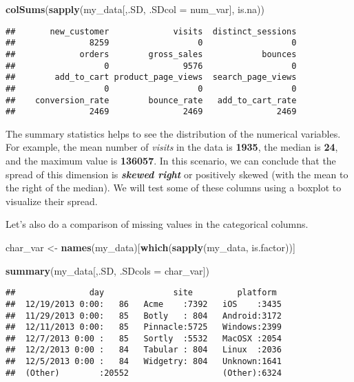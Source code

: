 \documentclass[]{article}
\newenvironment{Shaded}{\begin{snugshade}}{\end{snugshade}}
\newcommand{\KeywordTok}[1]{\textcolor[rgb]{0.13,0.29,0.53}{\textbf{{#1}}}}
\newcommand{\DataTypeTok}[1]{\textcolor[rgb]{0.13,0.29,0.53}{{#1}}}
\newcommand{\StringTok}[1]{\textcolor[rgb]{0.31,0.60,0.02}{{#1}}}
\newcommand{\NormalTok}[1]{{#1}}
\begin{document}
\begin{Shaded}
\begin{Highlighting}[]
\KeywordTok{colSums}\NormalTok{(}\KeywordTok{sapply}\NormalTok{(my_data[,.SD, }\DataTypeTok{.SDcol =} \NormalTok{num_var], is.na))}
\end{Highlighting}
\end{Shaded}

\begin{verbatim}
##       new_customer             visits  distinct_sessions 
##               8259                  0                  0 
##             orders        gross_sales            bounces 
##                  0               9576                  0 
##        add_to_cart product_page_views  search_page_views 
##                  0                  0                  0 
##    conversion_rate        bounce_rate   add_to_cart_rate 
##               2469               2469               2469
\end{verbatim}

The summary statistics helps to see the distribution of the numerical
variables. For example, the mean number of \emph{visits} in the data is
\textbf{1935}, the median is \textbf{24}, and the maximum value is
\textbf{136057}. In this scenario, we can conclude that the spread of
this dimension is \textbf{\emph{skewed right}} or positively skewed
(with the mean to the right of the median). We will test some of these
columns using a boxplot to visualize their spread.

\newline
\newline

Let's also do a comparison of missing values in the categorical columns.

\begin{Shaded}
\begin{Highlighting}[]
\NormalTok{char_var <-}\StringTok{ }\KeywordTok{names}\NormalTok{(my_data)[}\KeywordTok{which}\NormalTok{(}\KeywordTok{sapply}\NormalTok{(my_data, is.factor))]}

\KeywordTok{summary}\NormalTok{(my_data[,.SD, }\DataTypeTok{.SDcols =} \NormalTok{char_var])}
\end{Highlighting}
\end{Shaded}

\begin{verbatim}
##               day              site         platform   
##  12/19/2013 0:00:   86   Acme    :7392   iOS    :3435  
##  11/29/2013 0:00:   85   Botly   : 804   Android:3172  
##  12/11/2013 0:00:   85   Pinnacle:5725   Windows:2399  
##  12/7/2013 0:00 :   85   Sortly  :5532   MacOSX :2054  
##  12/2/2013 0:00 :   84   Tabular : 804   Linux  :2036  
##  12/5/2013 0:00 :   84   Widgetry: 804   Unknown:1641  
##  (Other)        :20552                   (Other):6324
\end{verbatim}
\end{document}
